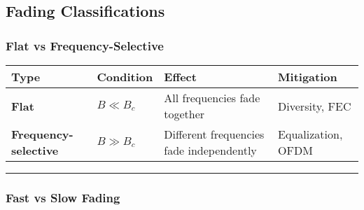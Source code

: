 \subsection{Fading Classifications}\label{fading-classifications}

\subsubsection{Flat vs
Frequency-Selective}\label{flat-vs-frequency-selective}

{\def\LTcaptype{} %
\begin{longtable}[]{@{}
  >{\raggedright\arraybackslash}p{}
  >{\raggedright\arraybackslash}p{}
  >{\raggedright\arraybackslash}p{}
  >{\raggedright\arraybackslash}p{}@{}}
\toprule\noalign{}
\begin{minipage}[b]{\linewidth}\raggedright
Type
\end{minipage} & \begin{minipage}[b]{\linewidth}\raggedright
Condition
\end{minipage} & \begin{minipage}[b]{\linewidth}\raggedright
Effect
\end{minipage} & \begin{minipage}[b]{\linewidth}\raggedright
Mitigation
\end{minipage} \\
\midrule\noalign{}
\endhead
\bottomrule\noalign{}
\endlastfoot
\textbf{Flat} & \(B \ll B_c\) & All frequencies fade together &
Diversity, FEC \\
\textbf{Frequency-selective} & \(B \gg B_c\) & Different frequencies
fade independently & Equalization, OFDM \\
\end{longtable}
}

\begin{center}\rule{0.5\linewidth}{0.5pt}\end{center}

\subsubsection{Fast vs Slow Fading}\label{fast-vs-slow-fading}

